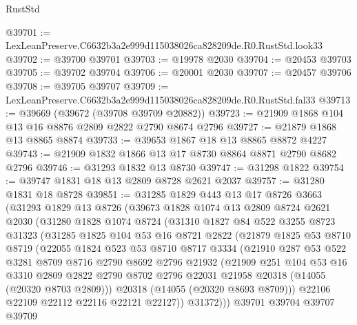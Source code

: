 \begin{lexlean}{RustStd}
\begin{coremodule}
@39701 := LexLeanPreserve.C6632b3a2e999d115038026ca828209de.R0.RustStd.look33
@39702 := @39700 @39701
@39703 := @19978 @2030
@39704 := @20453 @39703
@39705 := @39702 @39704
@39706 := @20001 @2030
@39707 := @20457 @39706
@39708 := @39705 @39707
@39709 := LexLeanPreserve.C6632b3a2e999d115038026ca828209de.R0.RustStd.fal33
@39713 := @39669 (@39672 (@39708 @39709 @20882))
@39723 := @21909 @1868 @104 @13 @16 @8876 @2809 @2822 @2790 @8674 @2796
@39727 := @21879 @1868 @13 @8865 @8874
@39733 := @39653 @1867 @18 @13 @8865 @8872 @4227
@39743 := @21909 @1832 @1866 @13 @17 @8730 @8864 @8871 @2790 @8682 @2796
@39746 := @31293 @1832 @13 @8730
@39747 := @31298 @1822
@39754 := @39747 @1831 @18 @13 @2809 @8728 @2621 @2037
@39757 := @31280 @1831 @18 @8728
@39851 := @31285
    @1829
    @443
    @13
    @17
    @8726
    @3663
    (@31293
      @1829
      @13
      @8726
      (@39673
        @1828
        @1074
        @13
        @2809
        @8724
        @2621
        @2030
        (@31280
          @1828
          @1074
          @8724
          (@31310
            @1827
            @84
            @522
            @3255
            @8723
            @31323
            (@31285
              @1825
              @104
              @53
              @16
              @8721
              @2822
              (@21879
                @1825
                @53
                @8710
                @8719
                (@22055
                  @1824
                  @523
                  @53
                  @8710
                  @8717
                  @3334
                  (@21910
                    @287
                    @53
                    @522
                    @3281
                    @8709
                    @8716
                    @2790
                    @8692
                    @2796
                    @21932
                    (@21909
                      @251
                      @104
                      @53
                      @16
                      @3310
                      @2809
                      @2822
                      @2790
                      @8702
                      @2796
                      @22031
                      @21958
                      @20318
                      (@14055 (@20320 @8703 @2809)))
                    @20318
                    (@14055 (@20320 @8693 @8709)))
                  @22106
                  @22109
                  @22112
                  @22116
                  @22121
                  @22127))
              @31372)))
        @39701
        @39704
        @39707
        @39709

\end{coremodule}
\end{lexlean}
